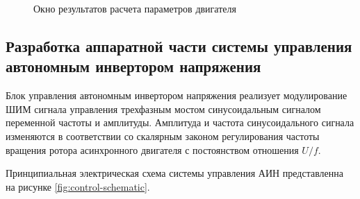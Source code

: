         \begin{figure}
            \caption{Окно результатов расчета параметров двигателя}
            \label{fig:static-scr1}
        \end{figure}



    \subsection{Разработка аппаратной части системы управления автономным
        инвертором напряжения}


        Блок управления автономным инвертором напряжения реализует
        модулирование ШИМ сигнала управления трехфазным мостом синусоидальным
        сигналом переменной частоты и амплитуды. Амплитуда и частота
        синусоидального сигнала изменяются в соответствии со скалярным законом
        регулирования частоты вращения ротора асинхронного двигателя с
        постоянством отношения $U/f$.

        Принципиальная электрическая схема системы управления АИН представленна
        на рисунке \ref{fig:control-schematic}.

